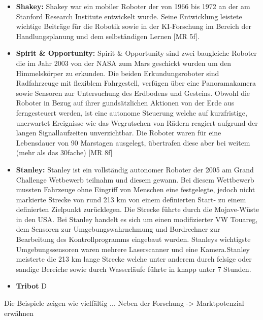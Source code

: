\begin{itemize}
	\item{\textbf{Shakey:}} Shakey war ein mobiler Roboter der von 1966 bis 1972 an der am Stanford Research Institute entwickelt wurde. Seine Entwicklung leistete wichtige Beiträge für die Robotik sowie in der KI-Forschung im Bereich der Handlungsplanung und dem selbständigen Lernen [MR 5f].
	\item{\textbf{Spirit \& Opportunity:}} Spirit \& Opportunity sind zwei baugleiche Roboter die im Jahr 2003 von der NASA zum Mars geschickt wurden um den Himmelskörper zu erkunden. Die beiden Erkundungsroboter sind Radfahrzeuge mit flexiblem Fahrgestell, verfügen über eine Panoramakamera sowie Sensoren zur Untersuchung des Erdbodens und Gesteins. Obwohl die Roboter in Bezug auf ihrer gundsätzlichen Aktionen von der Erde aus ferngesteuert werden, ist eine autonome Steuerung welche auf kurzfristige, unerwartet Ereignisse wie das Wegrutschen von Rädern reagiert aufgrund der langen Signallaufzeiten unverzichtbar. Die Roboter waren für eine
	Lebensdauer von 90 Marstagen ausgelegt, übertrafen diese aber bei weitem (mehr als das 30fache) [MR 8f]
	\item{\textbf{Stanley:}} Stanley ist ein vollständig autonomer Roboter der 2005 am Grand Challenge Wetbewerb teilnahm und diesem gewann. Bei diesem Wettbewerb mussten Fahrzeuge ohne Eingriff von Menschen eine festgelegte, jedoch nicht markierte Strecke von rund 213 km von einem definierten Start- zu einem definierten Zielpunkt zurücklegen. Die Strecke führte durch 
	die Mojave-Wüste in den USA. Bei Stanley handelt es sich um einen modifizierter VW Touareg, dem Sensoren zur Umgebungswahrnehmung und Bordrechner zur Bearbeitung des Kontrollprogramms eingebaut wurden. Stanleys wichtigste Umgebungssensoren waren mehrere Laserscanner und eine Kamera.Stanley meisterte die 213 km lange Strecke welche unter anderem durch felsige
	oder sandige Bereiche sowie durch Wasserläufe führte in knapp unter 7 Stunden.
	\item{\textbf{Tribot}} D
\end{itemize}
Die Beispiele zeigen wie vielfältig ...
Neben der Forschung -> Marktpotenzial erwähnen

